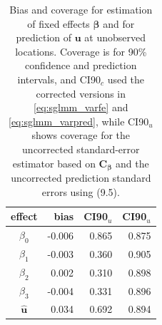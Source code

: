 \documentclass[12pt, titlepage]{article}
\begin{document}
\begin{table}[H] 
	\caption{Bias and coverage for estimation of fixed effects $\boldsymbol{\beta}$ and for prediction of $\mathbf{u}$ at unobserved locations.  Coverage is for 90\% confidence and prediction intervals, and CI90$_{c}$ used the corrected versions in \eqref{eq:sglmm_varfe} and \eqref{eq:sglmm_varpred}, while CI90$_{u}$ shows coverage for the uncorrected standard-error estimator based on $\mathbf{C}_{\boldsymbol{\beta}}$ and the uncorrected prediction standard errors using (9.5).  \label{tab:sglm_fe}}
\begin{center}
\begin{tabular}{|c|rrr|}
\hline
\hline
effect & bias & CI90$_{u}$ & CI90$_{u}$ \\
\hline{}
$\beta_{0}$ & -0.006 & 0.865 & 0.875 \\ 
$\beta_{1}$ &    -0.003 & 0.360 & 0.905 \\ 
$\beta_{2}$ &   0.002 & 0.310 & 0.898 \\ 
$\beta_{3}$ &   -0.004 & 0.331 & 0.896 \\ 
$\hat{\mathbf{u}}$ &   0.034 & 0.692 & 0.894 \\  
\hline
\hline
\end{tabular}
\end{center}
\end{table}



%


%
%
\end{document}

